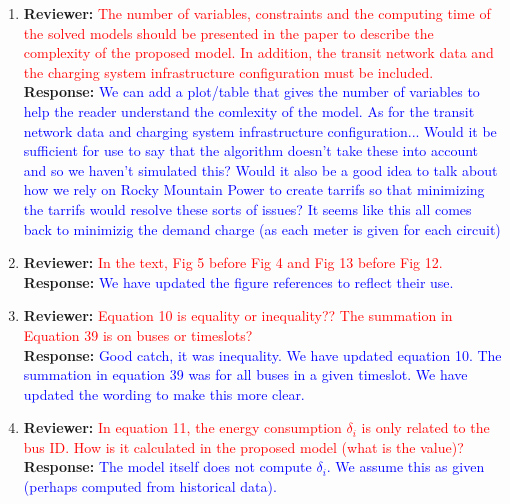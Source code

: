\documentclass{article}
\newcommand\formatfeedback[2]
{%
	\textbf{Reviewer:} \textcolor{red}{#1} 
	\leavevmode\\[0.1in] \textbf{Response:} \textcolor{blue}{#2}
}
\begin{document}
\begin{enumerate}
{operation. Will the results change if these chargers are used?}{It's possible that the results could change (in that perhaps there would be non-maximum optimal charge rates).  I wouldn't anticipate anything else change all that much...}
	\item \formatfeedback{The number of variables, constraints and the computing time of the solved models should be
presented in the paper to describe the complexity of the proposed model. In addition, the transit
network data and the charging system infrastructure configuration must be included.}{We can add a plot/table that gives the number of variables to help the reader understand the comlexity of the model.  As for the transit network data and charging system infrastructure configuration... Would it be sufficient for use to say that the algorithm doesn't take these into account and so we haven't simulated this?  Would it also be a good idea to talk about how we rely on Rocky Mountain Power to create tarrifs so that minimizing the tarrifs would resolve these sorts of issues? It seems like this all comes back to minimizig the demand charge (as each meter is given for each circuit)}
	\item \formatfeedback{In the text, Fig 5 before Fig 4 and Fig 13 before Fig 12.}{We have updated the figure references to reflect their use.}
	\item \formatfeedback{Equation 10 is equality or inequality?? The summation in Equation 39 is on buses or timeslots?}{Good catch, it was inequality.  We have updated equation 10. The summation in equation 39 was for all buses in a given timeslot. We have updated the wording to make this more clear.}
	\item \formatfeedback{In equation 11, the energy consumption $\delta_i$ is only related to the bus ID. How is it calculated in
the proposed model (what is the value)?}{The model itself does not compute $\delta_i$. We assume this as given (perhaps computed from historical data).}
\end{enumerate}
\end{document}
